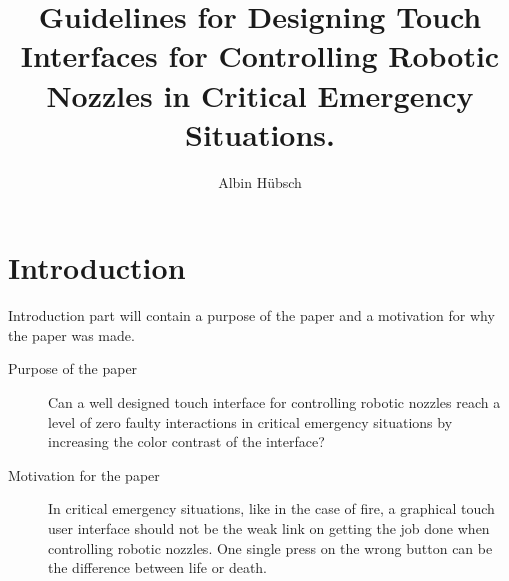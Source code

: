 \documentclass[runningheads,a4paper,oribibl]{llncs}
\begin{document}
\pagestyle{headings}

\mainmatter

\title{Guidelines for Designing Touch Interfaces for Controlling Robotic Nozzles in Critical Emergency Situations.}


\author{Albin Hübsch}


\maketitle

%
%

\section{Introduction}
Introduction part will contain a purpose of the paper and a motivation for why the paper was made.

\begin{description}
	\item[Purpose of the paper] Can a well designed touch interface for controlling robotic nozzles reach a level of zero faulty interactions in critical emergency situations by increasing the color contrast of the interface?
	\item[Motivation for the paper] In critical emergency situations, like in the case of fire, a graphical touch user interface should not be the weak link on getting the job done when controlling robotic nozzles. One single press on the wrong button can be the difference between life or death.
\end{description}
\end{document}
